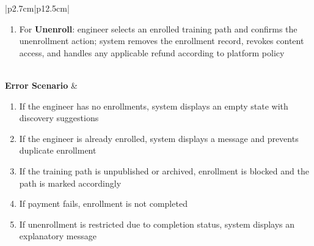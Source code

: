 \begin{table}[H]
\begin{tabular}{|p{2.7cm}|p{12.5cm}|}
\begin{minipage}[t]{\linewidth}
\begin{enumerate}[topsep=0pt,itemsep=1pt,parsep=0pt,partopsep=0pt]
                                                    enrollment record and grants access to all modules and units
                                              \item For \textbf{Unenroll}: engineer selects an enrolled training path and confirms
                                                    the unenrollment action; system removes the enrollment record, revokes content
                                                    access, and handles any applicable refund according to platform policy
                                          \end{enumerate}
                                      \end{minipage}                                 \\
            \hline
            \textbf{Error Scenario} & \begin{minipage}[t]{\linewidth}
                                          \begin{enumerate}[topsep=0pt,itemsep=1pt,parsep=0pt,partopsep=0pt]
                                              \item If the engineer has no enrollments, system displays an empty state with
                                                    discovery suggestions
                                              \item If the engineer is already enrolled, system displays a message and prevents
                                                    duplicate enrollment
                                              \item If the training path is unpublished or archived, enrollment is blocked and the
                                                    path is marked accordingly
                                              \item If payment fails, enrollment is not completed
                                              \item If unenrollment is restricted due to completion status, system displays an
                                                    explanatory message
                                          \end{enumerate}
                                      \end{minipage}                                 \\
            \hline
        \end{tabular}
        \label{tab:eng-enrollment}
    \end{table}

